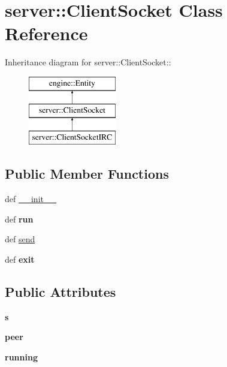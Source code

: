\hypertarget{classserver_1_1ClientSocket}{
\section{server::ClientSocket Class Reference}
\label{classserver_1_1ClientSocket}
}
Inheritance diagram for server::ClientSocket::\begin{figure}[H]
\begin{center}
\leavevmode
\includegraphics[height=3cm]{classserver_1_1ClientSocket}
\end{center}
\end{figure}
\subsection*{Public Member Functions}
\begin{DoxyCompactItemize}
\item 
def \hyperlink{classserver_1_1ClientSocket_aaeb638a576ccbac7a8a0d96a680b55fe}{\_\-\_\-init\_\-\_\-}
\item 
\hypertarget{classserver_1_1ClientSocket_aa3630c3c7dcb84037b537a81ee513247}{
def {\bfseries run}}
\label{classserver_1_1ClientSocket_aa3630c3c7dcb84037b537a81ee513247}

\item 
def \hyperlink{classserver_1_1ClientSocket_af0ce9184f5505c6fee6cc4a767f84198}{send}
\item 
\hypertarget{classserver_1_1ClientSocket_af95a5408be10559e255f37b54bcbc73e}{
def {\bfseries exit}}
\label{classserver_1_1ClientSocket_af95a5408be10559e255f37b54bcbc73e}

\end{DoxyCompactItemize}
\subsection*{Public Attributes}
\begin{DoxyCompactItemize}
\item 
\hypertarget{classserver_1_1ClientSocket_ae3ab6b3e713565897b0e8f570c8744f2}{
{\bfseries s}}
\label{classserver_1_1ClientSocket_ae3ab6b3e713565897b0e8f570c8744f2}

\item 
\hypertarget{classserver_1_1ClientSocket_ad97dd671ec62a77a90e89370f07e680c}{
{\bfseries peer}}
\label{classserver_1_1ClientSocket_ad97dd671ec62a77a90e89370f07e680c}

\item 
\hypertarget{classserver_1_1ClientSocket_a9f77c1171467ed535dbae07d4c402251}{
{\bfseries running}}
\label{classserver_1_1ClientSocket_a9f77c1171467ed535dbae07d4c402251}

\end{DoxyCompactItemize}



